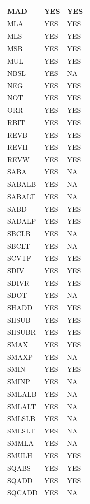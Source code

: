\begin{longtable}{|l|l|l|}
\hline
MAD & YES & YES\\
\hline
MLA & YES & YES\\
\hline
MLS & YES & YES\\
\hline
MSB & YES & YES\\
\hline
MUL & YES & YES\\
\hline
NBSL & YES & NA\\
\hline
NEG & YES & YES\\
\hline
NOT & YES & YES\\
\hline
ORR & YES & YES\\
\hline
RBIT & YES & YES\\
\hline
REVB & YES & YES\\
\hline
REVH & YES & YES\\
\hline
REVW & YES & YES\\
\hline
SABA & YES & NA\\
\hline
SABALB & YES & NA\\
\hline
SABALT & YES & NA\\
\hline
SABD & YES & YES\\
\hline
SADALP & YES & YES\\
\hline
SBCLB & YES & NA\\
\hline
SBCLT & YES & NA\\
\hline
SCVTF & YES & YES\\
\hline
SDIV & YES & YES\\
\hline
SDIVR & YES & YES\\
\hline
SDOT & YES & NA\\
\hline
SHADD & YES & YES\\
\hline
SHSUB & YES & YES\\
\hline
SHSUBR & YES & YES\\
\hline
SMAX & YES & YES\\
\hline
SMAXP & YES & NA\\
\hline
SMIN & YES & YES\\
\hline
SMINP & YES & NA\\
\hline
SMLALB & YES & NA\\
\hline
SMLALT & YES & NA\\
\hline
SMLSLB & YES & NA\\
\hline
SMLSLT & YES & NA\\
\hline
SMMLA & YES & NA\\
\hline
SMULH & YES & YES\\
\hline
SQABS & YES & YES\\
\hline
SQADD & YES & YES\\
\hline
SQCADD & YES & NA\\

\end{longtable}
